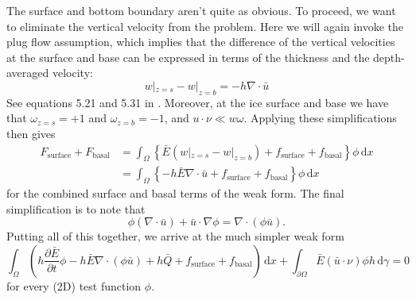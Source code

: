 \documentclass{article}
\theoremstyle{definition}
\theoremstyle{plain}
\newcommand{\ud}{\hspace{2pt}\mathrm{d}}
\begin{document}
The surface and bottom boundary aren't quite as obvious.
To proceed, we want to eliminate the vertical velocity from the problem.
Here we will again invoke the plug flow assumption, which implies that the difference of the vertical velocities at the surface and base can be expressed in terms of the thickness and the depth-averaged velocity:
\begin{equation}
    w|_{z = s} - w|_{z = b} = -h\nabla\cdot\bar u
    \label{eq:vertical-velocity-difference}
\end{equation}
See equations 5.21 and 5.31 in \citet{greve2009dynamics}.
Moreover, at the ice surface and base we have that $\omega_{z = s} = +1$ and $\omega_{z = b} = -1$, and $u\cdot \nu \ll w\omega$.
Applying these simplifications then gives
\begin{align}
    F_{\text{surface}} + F_{\text{basal}} & = \int_\Omega \left\{\bar E(w|_{z = s} - w|_{z = b}) + f_{\text{surface}} + f_{\text{basal}}\right\}\phi \ud x \\
    & = \int_\Omega\left\{-h\bar E\nabla\cdot\bar u + f_{\text{surface}} + f_{\text{basal}}\right\}\phi\ud x
\end{align}
for the combined surface and basal terms of the weak form.
The final simplification is to note that
\begin{equation}
    \phi(\nabla\cdot \bar u) + \bar u\cdot\nabla\phi = \nabla\cdot(\phi\bar u).
\end{equation}
Putting all of this together, we arrive at the much simpler weak form
\begin{equation}
    \int_\Omega\left(h\frac{\partial\bar E}{\partial t}\phi - h\bar E\nabla\cdot(\phi\bar u) + h\bar Q + f_{\text{surface}} + f_{\text{basal}}\right)\ud x +\int_{\partial\Omega}\bar E(\bar u\cdot\nu)\phi h\ud\gamma = 0
\end{equation}
for every (2D) test function $\phi$.

\pagebreak



\end{document}

